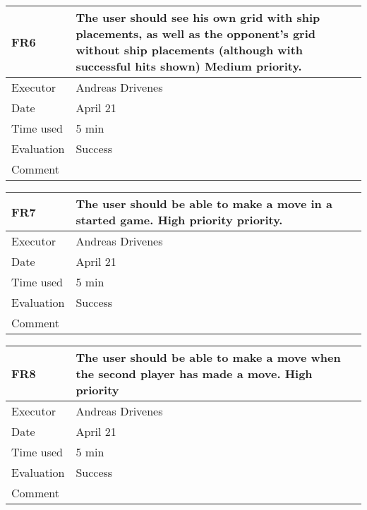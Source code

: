 \begin{table}[H]
\begin{tabular}{|l|p{10cm}|}
\hline
\textbf{FR6} & The user should see his own grid with ship placements, as well as the opponent’s grid without ship placements (although with successful hits shown) Medium priority. \\ \hline
Executor    & Andreas Drivenes            \\ \hline
Date        & April 21            \\ \hline
Time used   & 5 min            \\ \hline
Evaluation  & Success            \\ \hline
Comment     &          \\ \hline
\end{tabular}
\end{table}

\begin{table}[H]
\begin{tabular}{|l|p{10cm}|}
\hline
\textbf{FR7} & The user should be able to make a move in a started game. High priority priority. \\ \hline
Executor    & Andreas Drivenes            \\ \hline
Date        & April 21            \\ \hline
Time used   & 5 min            \\ \hline
Evaluation  & Success            \\ \hline
Comment     &          \\ \hline
\end{tabular}
\end{table}

\begin{table}[H]
\begin{tabular}{|l|p{10cm}|}
\hline
\textbf{FR8} & The user should be able to make a move when the second player has made a move. High priority \\ \hline
Executor    & Andreas Drivenes            \\ \hline
Date        & April 21            \\ \hline
Time used   & 5 min            \\ \hline
Evaluation  & Success            \\ \hline
Comment     &          \\ \hline
\end{tabular}
\end{table}

